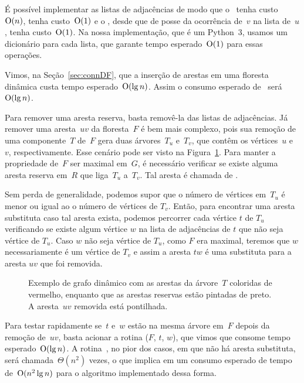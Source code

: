 É possível implementar as listas de adjacências de modo que o~\graphCreate{} tenha custo~$\mathrm{O}(n)$, \graphAdd tenha custo~$\mathrm{O}(1)$
e o \graphDel{}, desde que de posse da ocorrência de~$v$ na lista de~$u$, tenha custo~$\mathrm{O}(1)$.
Na nossa implementação, que é um Python~$3$, usamos um dicionário para cada lista, que garante tempo esperado~$\mathrm{O}(1)$ para essas operações.

Vimos, na Seção~\ref{sec:connDF}, que a inserção de arestas em uma floresta dinâmica custa tempo esperado~$\mathrm{O}(\lg n)$.
Assim o consumo esperado de~\dymGraphAddEdge{} será~$\mathrm{O}(\lg n)$.

Para remover uma aresta reserva, basta removê-la das listas de adjacências.
Já remover uma aresta~$uv$ da floresta~$F$ é bem mais complexo, pois sua remoção de uma componente~$T$ de~$F$ gera duas árvores~$T_u$ e~$T_v$, que contêm os vértices~$u$ e~$v$, respectivamente. Esse cenário pode ser visto na Figura~\ref{fig:DG-exemploTu-Tv}. Para manter a propriedade de~$F$ ser maximal em~$G$, é necessário verificar se existe alguma aresta reserva em~$R$ que liga~$T_u$ a~$T_v$. Tal aresta é chamada de .

Sem perda de generalidade, podemos supor que o número de vértices em~$T_u$ é menor ou igual ao o número de vértices de $T_v$.
Então, para encontrar uma aresta substituta caso tal aresta exista, podemos percorrer cada vértice $t$ de $T_u$ verificando se existe algum vértice $w$ na lista de adjacências de $t$ que não seja vértice de $T_u$. Caso $w$ não seja vértice de $T_u$, como $F$ era maximal, teremos que $w$ necessariamente é um vértice de $T_v$ e assim a aresta $tw$ é uma substituta para a aresta $uv$ que foi removida.

\begin{figure}[htb]
\centering
\caption{Exemplo de grafo dinâmico com as arestas da árvore~$T$ coloridas de vermelho, enquanto que as arestas reservas estão pintadas de preto. A aresta~$uv$ removida está pontilhada.}
\label{fig:DG-exemploTu-Tv}
\end{figure}

Para testar rapidamente se~$t$ e~$w$ estão na mesma árvore em~$F$ depois da remoção de~$uv$, basta acionar a rotina \dymForestQuery($F$, $t$, $w$), que vimos que consome tempo esperado~$\mathrm{O}(\lg n)$. A rotina~\dymForestQuery{}, no pior dos casos, em que não há aresta substituta, será chamada~$\Theta(n^2)$ vezes, o que implica em um consumo esperado de tempo de~$\mathrm{O}(n^2\lg n)$ para o algoritmo implementado dessa forma.

